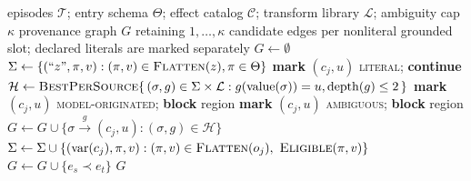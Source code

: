 \begin{algorithm}[t]
\caption{\textsc{BuildPatg} --- typed argument provenance. A slot with no witness is a
slot unresolved in the bounded library; a slot with too many witnesses is ambiguous. Both block the
region rather than defaulting to the cheapest explanation.}
\label{alg:patg}
\footnotesize
\begin{algorithmic}[1]
\Require episodes $\mathcal{T}$; entry schema $\Theta$; effect catalog $\mathcal{C}$;
         transform library $\mathcal{L}$; ambiguity cap $\kappa$
\Ensure provenance graph $G$ retaining $1,\ldots,\kappa$ candidate edges per
        nonliteral grounded slot; declared literals are marked separately
\State $G\gets\emptyset$
  \State $\Sigma\gets\{(\text{``}z\text{''},\pi,v) : (\pi,v)\in\textsc{Flatten}(z),
         \pi\in\Theta\}$ 
        \State \textbf{mark} $(c_j,u)$ \textsc{literal}; \textbf{continue}
      \EndIf
      \State $\mathcal{H}\gets\textsc{BestPerSource}\{\,(\sigma,g)\in
             \Sigma\times\mathcal{L}:g(\operatorname{value}(\sigma))=u,
             \operatorname{depth}(g)\le2\,\}$
        \State \textbf{mark} $(c_j,u)$ \textsc{model-originated}; \textbf{block} region
        \State \textbf{mark} $(c_j,u)$ \textsc{ambiguous}; \textbf{block} region
      \Else
        \State $G\gets G\cup\{\sigma\xrightarrow{\,g\,}(c_j,u):
               (\sigma,g)\in\mathcal{H}\}$
      \EndIf
    \EndFor
    \State $\Sigma\gets\Sigma\cup\{(\operatorname{var}(c_j),\pi,v) :
           (\pi,v)\in\textsc{Flatten}(o_j),\ \textsc{Eligible}(\pi,v)\}$
  \EndFor
    \State $G\gets G\cup\{e_s\prec e_t\}$
  \EndFor
\EndFor
\State \Return $G$
\end{algorithmic}
\end{algorithm}
